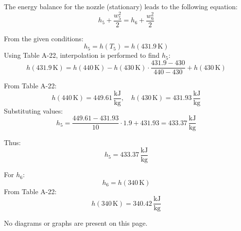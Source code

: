 The energy balance for the nozzle (stationary) leads to the following equation:  
\[
h_5 + \frac{w_5^2}{2} = h_6 + \frac{w_6^2}{2}
\]

From the given conditions:  
\[
h_5 = h(T_5) = h(431.9 \, \text{K})
\]  
Using Table A-22, interpolation is performed to find \( h_5 \):  
\[
h(431.9 \, \text{K}) = h(440 \, \text{K}) - h(430 \, \text{K}) \cdot \frac{431.9 - 430}{440 - 430} + h(430 \, \text{K})
\]  

From Table A-22:  
\[
h(440 \, \text{K}) = 449.61 \, \frac{\text{kJ}}{\text{kg}}, \quad h(430 \, \text{K}) = 431.93 \, \frac{\text{kJ}}{\text{kg}}
\]  
Substituting values:  
\[
h_5 = \frac{449.61 - 431.93}{10} \cdot 1.9 + 431.93 = 433.37 \, \frac{\text{kJ}}{\text{kg}}
\]  

Thus:  
\[
h_5 = 433.37 \, \frac{\text{kJ}}{\text{kg}}
\]

For \( h_6 \):  
\[
h_6 = h(340 \, \text{K})
\]  
From Table A-22:  
\[
h(340 \, \text{K}) = 340.42 \, \frac{\text{kJ}}{\text{kg}}
\]  

No diagrams or graphs are present on this page.